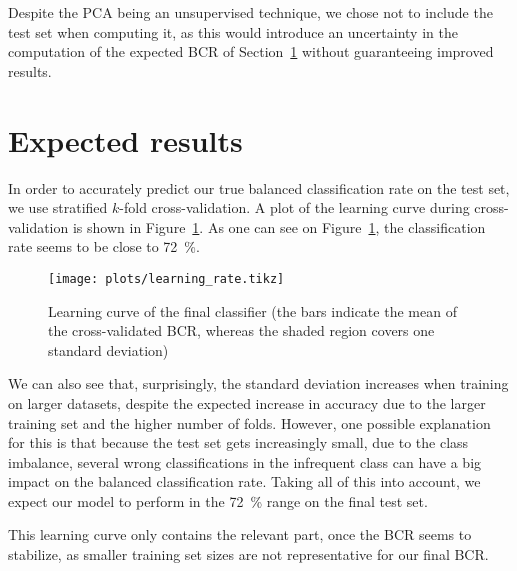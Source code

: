 \documentclass{article}
\begin{document}
Despite the PCA being an unsupervised technique, we chose not to include the test set when computing it, as this would introduce an uncertainty in the computation of the expected BCR of Section~\ref{sec:bcr} without guaranteeing improved results.

\section{Expected results}
\label{sec:bcr}

In order to accurately predict our true balanced classification rate on the test set, we use stratified \(k\)-fold cross-validation.
A plot of the learning curve during cross-validation is shown in Figure~\ref{fig:lr}.
As one can see on Figure~\ref{fig:lr}, the classification rate seems to be close to \SI{72}{\percent}.
\begin{figure}[!hbtp]
	\centering
	\texttt{[image: plots/learning\_rate.tikz]}
	\caption{Learning curve of the final classifier (the bars indicate the mean of the cross-validated BCR, whereas the shaded region covers one standard deviation)}
	\label{fig:lr}
\end{figure}
We can also see that, surprisingly, the standard deviation increases when training on larger datasets, despite the expected increase in accuracy due to the larger training set and the higher number of folds.
However, one possible explanation for this is that because the test set gets increasingly small, due to the class imbalance, several wrong classifications in the infrequent class can have a big impact on the balanced classification rate.
Taking all of this into account, we expect our model to perform in the \SI{72}{\percent} range on the final test set.

This learning curve only contains the relevant part, once the BCR seems to stabilize, as smaller training set sizes are not representative for our final BCR.
\end{document}
